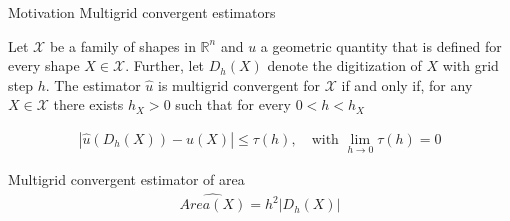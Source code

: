 \begin{frame}
{Motivation}
{Multigrid convergent estimators}

\begin{definition}
	Let $\mathcal{X}$ be a family of shapes in $\mathbb{R}^n$ and $u$ a geometric quantity that is defined for every shape $X \in \mathcal{X}$. Further, let $D_h(X)$ denote the digitization of $X$ with grid step $h$.%
%
\vspace{1em}	
%	
	 The estimator $\hat{u}$ is multigrid convergent for $\mathcal{X}$ if and only if, for any $X \in \mathcal{X}$ there exists $h_X > 0$ such that for every $0< h < h_X$
	
	\begin{align*}
		| \hat{u}(D_h(X)) - u(X) | \leq \tau(h), \quad \text{with } \lim_{h\rightarrow 0}{\tau(h)} = 0
	\end{align*}	
\end{definition}
%
\pause
%
Multigrid convergent estimator of area
\begin{align*}
	\widehat{Area(X)} = h^2|D_h(X)|
\end{align*}
%
\end{frame}

